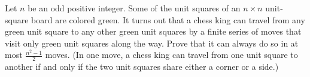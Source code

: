 Let $n$ be an odd positive integer. Some of the unit squares of an $n\times n$ unit-square board are colored green. It turns out that a chess king can travel from any green unit square to any other green unit squares by a finite series of moves that visit only green unit squares along the way. Prove that it can always do so in at most $\frac{n^2-1}{2}$ moves. (In one move, a chess king can travel from one unit square to another if and only if the two unit squares share either a corner or a side.)
